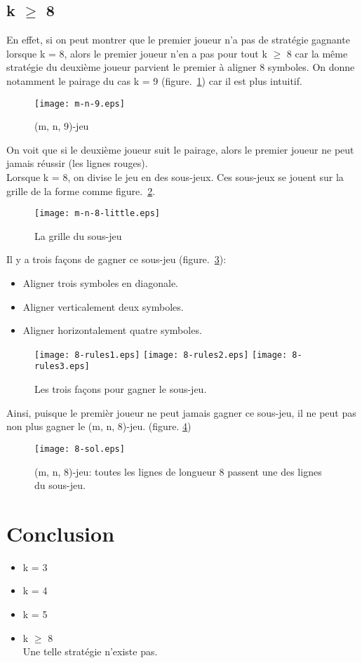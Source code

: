 \documentclass[12pt, a4paper]{article}
\begin{document}
\subsection{k $\ge$ 8}
En effet, si on peut montrer que le premier joueur n'a pas de stratégie gagnante lorsque k = 8, alors le premier joueur n'en a pas pour tout k $\ge$ 8 car la même stratégie du deuxième joueur parvient le premier à aligner 8 symboles. On donne notamment le pairage du cas k = 9 \mbox{(figure. \ref{fig:m-n-9})} car il est plus intuitif.
\begin{figure}[h!]
    \centering
    \texttt{[image: m-n-9.eps]}
    \caption{(m, n, 9)-jeu}
    \label{fig:m-n-9}
\end{figure}
On voit que si le deuxième joueur suit le pairage, alors le premier joueur ne peut jamais réussir (les lignes rouges).\\
Lorsque k = 8, on divise le jeu en des sous-jeux. Ces sous-jeux se jouent sur la grille de la forme comme \mbox{figure. \ref{fig:sous-jeu}.}
\begin{figure}[h!]
    \centering
    \texttt{[image: m-n-8-little.eps]}
    \caption{La grille du sous-jeu}
    \label{fig:sous-jeu}
\end{figure}
Il y a trois façons de gagner ce sous-jeu \mbox{(figure. \ref{fig:regle}):}
\begin{itemize}
    \item Aligner trois symboles en diagonale.
    \item Aligner verticalement deux symboles.
    \item Aligner horizontalement quatre symboles.
\end{itemize}
\begin{figure}[h!]
    \centering
    \texttt{[image: 8-rules1.eps]}
    \texttt{[image: 8-rules2.eps]}
    \texttt{[image: 8-rules3.eps]}
    \caption{Les trois façons pour gagner le sous-jeu.}
    \label{fig:regle}
\end{figure}
Ainsi, puisque le premièr joueur ne peut jamais gagner ce sous-jeu, il ne peut pas non plus gagner le (m, n, 8)-jeu. (figure. \ref{fig:m-n-8})
\begin{figure}[h!]
    \centering
    \texttt{[image: 8-sol.eps]}
    \caption{(m, n, 8)-jeu:
    toutes les lignes de longueur 8 passent une des lignes du sous-jeu.}
    \label{fig:m-n-8}
\end{figure}
\section{Conclusion}

\begin{itemize}
    \item k = 3
    \item k = 4
    \item k = 5
    \item k $\ge$ 8\\
        Une telle stratégie n'existe pas.
\end{itemize}
\end{document}
